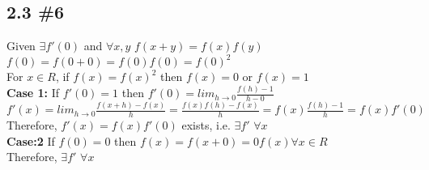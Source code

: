 \documentclass[12pt]{article}
\begin{document}
\subsection{2.3 \#6}
Given $\exists f'(0)$ and $\forall x,y$ $f(x+y) = f(x)f(y)$ \\
$f(0) = f(0+0) = f(0)f(0) = f(0)^{2}$ \\
For $x \in R$, if $f(x) = f(x)^{2}$ then $f(x) = 0$ or $f(x) = 1$ \\
\textbf{Case 1:} If $f'(0) = 1$ then $f'(0) = lim_{h \to 0} \frac{f(h)-1}{h-0}$ \\
$f'(x) = lim_{h \to 0} \frac{f(x+h)-f(x)}{h} = \frac{f(x)f(h)-f(x)}{h} = f(x) \frac{f(h)-1}{h} = f(x)f'(0)$ \\
Therefore, $f'(x) = f(x)f'(0)$ exists, i.e. $\exists f'$ $\forall x$ \\
\textbf{Case:2} If $f(0) = 0$ then $f(x) = f(x+0) = 0f(x) \forall x \in R$ \\
Therefore, $\exists f'$ $\forall x$
\end{document}
